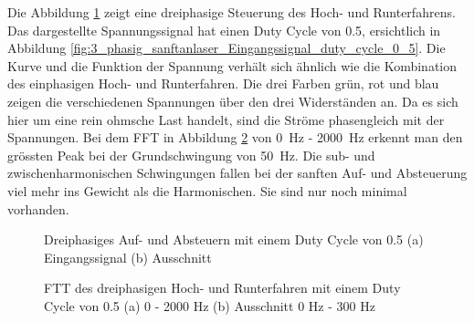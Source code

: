 Die Abbildung \ref{fig:drei_phasiges_Sanft_anlassen} zeigt eine dreiphasige Steuerung des Hoch- und Runterfahrens. Das dargestellte Spannungssignal hat einen Duty Cycle von 0.5, ersichtlich in Abbildung \ref{fig:3_phasig_sanftanlaser_Eingangssignal_duty_cycle_0_5}. Die Kurve und die Funktion der Spannung verhält sich ähnlich wie die Kombination des einphasigen Hoch- und Runterfahren. Die drei Farben grün, rot und blau zeigen die verschiedenen Spannungen über den drei Widerständen an. Da es sich hier um eine rein ohmsche Last handelt, sind die Ströme phasengleich mit der Spannungen. Bei dem FFT in Abbildung \ref{fig:dreiphasiges_Sanft_anlassen_FTT} von \SI{0}{Hz} - \SI{2000}{Hz} erkennt man den grössten Peak bei der Grundschwingung von \SI{50}{Hz}. Die sub- und zwischenharmonischen Schwingungen fallen bei der sanften Auf- und Absteuerung viel mehr ins Gewicht als die Harmonischen. Sie sind nur noch minimal vorhanden.   


\begin{figure}[ht!]
	\centering
	\qquad
	\caption{Dreiphasiges Auf- und Absteuern mit einem Duty Cycle von 0.5 (a) Eingangssignal (b) Ausschnitt}
	\label{fig:drei_phasiges_Sanft_anlassen}
\end{figure}

\begin{figure}[ht!]
	\centering
	\qquad
	\caption{FTT des dreiphasigen Hoch- und Runterfahren mit einem Duty Cycle von 0.5 (a) 0 - 2000 Hz (b) Ausschnitt 0 Hz - 300 Hz}
	\label{fig:dreiphasiges_Sanft_anlassen_FTT}
\end{figure}

\newpage



